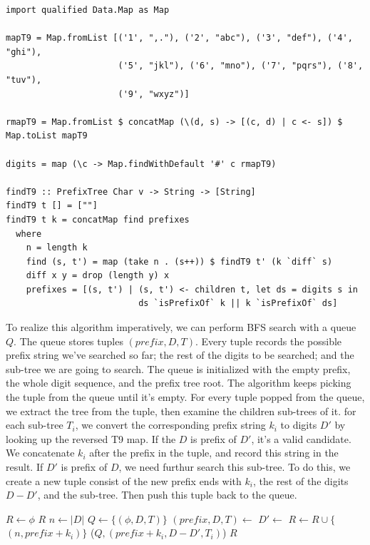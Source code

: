 \documentclass[b5paper]{article}
\begin{document}
\lstset{language=Haskell}
\begin{lstlisting}
import qualified Data.Map as Map

mapT9 = Map.fromList [('1', ",."), ('2', "abc"), ('3', "def"), ('4', "ghi"),
                      ('5', "jkl"), ('6', "mno"), ('7', "pqrs"), ('8', "tuv"),
                      ('9', "wxyz")]

rmapT9 = Map.fromList $ concatMap (\(d, s) -> [(c, d) | c <- s]) $ Map.toList mapT9

digits = map (\c -> Map.findWithDefault '#' c rmapT9)

findT9 :: PrefixTree Char v -> String -> [String]
findT9 t [] = [""]
findT9 t k = concatMap find prefixes
  where
    n = length k
    find (s, t') = map (take n . (s++)) $ findT9 t' (k `diff` s)
    diff x y = drop (length y) x
    prefixes = [(s, t') | (s, t') <- children t, let ds = digits s in
                          ds `isPrefixOf` k || k `isPrefixOf` ds]
\end{lstlisting}

To realize this algorithm imperatively, we can perform BFS search with a queue $Q$.
The queue stores tuples $(prefix, D, T)$. Every tuple records the possible
prefix string we've searched so far; the rest of the digits to be searched;
and the sub-tree we are going to search. The queue is initialized with the
empty prefix, the whole digit sequence, and the prefix tree root. The algorithm
keeps picking the tuple from the queue until it's empty. For every tuple
popped from the queue, we extract the tree from the tuple, then examine the
children sub-trees of it. for each sub-tree $T_i$, we convert the corresponding
prefix string $k_i$ to digits $D'$ by looking up the reversed T9 map. If the
$D$ is prefix of $D'$, it's a valid candidate. We concatenate $k_i$ after
the prefix in the tuple, and record this string in the result. If $D'$ is
prefix of $D$, we need furthur search this sub-tree. To do this, we
create a new tuple consist of the new prefix ends with $k_i$, the rest of
the digits $D-D'$, and the sub-tree. Then push this tuple back to the queue.

\begin{algorithmic}[1]
  \State $R \gets \phi$
    \State \Return $R$
  \EndIf
  \State $n \gets |D|$
  \State $Q \gets \{(\phi, D, T)\}$
    \State $(prefix, D, T) \gets$ 
      \State $D' \gets$ 
       
        \State $R \gets R \cup \{$  $(n, prefix + k_i) \}$ 
        \State {}($Q, (prefix + k_i, D - D', T_i)$)
      \EndIf
    \EndFor
  \EndWhile
  \State \Return $R$
\EndFunction
\end{algorithmic}
\end{document}
